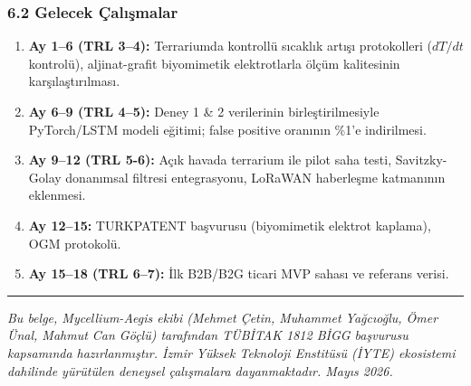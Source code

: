 \documentclass[11pt,a4paper]{article}
\begin{document}
\subsubsection*{6.2 Gelecek Çalışmalar}

\begin{enumerate}[leftmargin=1.2cm]
  \item \textbf{Ay 1--6 (TRL 3--4):} Terrariumda kontrollü sıcaklık artışı protokolleri ($dT/dt$ kontrolü), aljinat-grafit biyomimetik elektrotlarla ölçüm kalitesinin karşılaştırılması.
  \item \textbf{Ay 6--9 (TRL 4--5):} Deney 1 \& 2 verilerinin birleştirilmesiyle PyTorch/LSTM modeli eğitimi; false positive oranının \%1'e indirilmesi.
  \item \textbf{Ay 9--12 (TRL 5-6):} Açık havada terrarium ile pilot saha testi, Savitzky-Golay donanımsal filtresi entegrasyonu, LoRaWAN haberleşme katmanının eklenmesi.
  \item \textbf{Ay 12--15:} TURKPATENT başvurusu (biyomimetik elektrot kaplama), OGM protokolü.
  \item \textbf{Ay 15--18 (TRL 6--7):} İlk B2B/B2G ticari MVP sahası ve referans verisi.
\end{enumerate}

\bigskip
\noindent\rule{\linewidth}{0.4pt}

\medskip
\noindent\textit{Bu belge, Mycellium-Aegis ekibi (Mehmet Çetin, Muhammet Yağcıoğlu, Ömer Ünal, Mahmut Can Göçlü) tarafından TÜBİTAK 1812 BİGG başvurusu kapsamında hazırlanmıştır. İzmir Yüksek Teknoloji Enstitüsü (İYTE) ekosistemi dahilinde yürütülen deneysel çalışmalara dayanmaktadır. Mayıs 2026.}
\end{document}
